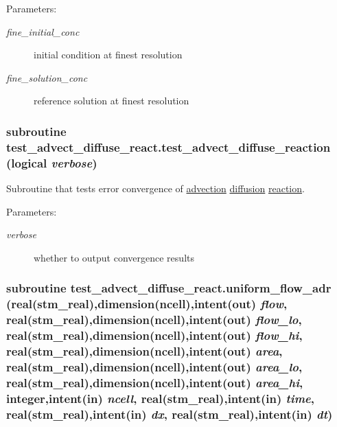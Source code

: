 \begin{Desc}
\item[Parameters:]
\begin{description}
\item[{\em fine\_\-initial\_\-conc}]initial condition at finest resolution\item[{\em fine\_\-solution\_\-conc}]reference solution at finest resolution \end{description}
\end{Desc}
\hypertarget{a00074_934ab4a35a65983c1d52041a6c8c439d}{
\subsubsection[{test\_\-advect\_\-diffuse\_\-reaction}]{\setlength{\rightskip}{0pt plus 5cm}subroutine test\_\-advect\_\-diffuse\_\-react.test\_\-advect\_\-diffuse\_\-reaction (logical {\em verbose})}}
\label{a00074_934ab4a35a65983c1d52041a6c8c439d}


Subroutine that tests error convergence of \hyperlink{a00052}{advection} \hyperlink{a00056}{diffusion} \hyperlink{a00068}{reaction}. 

\begin{Desc}
\item[Parameters:]
\begin{description}
\item[{\em verbose}]whether to output convergence results \end{description}
\end{Desc}
\hypertarget{a00074_80f3a58632d50f76f33e2e90157c7afd}{
\subsubsection[{uniform\_\-flow\_\-adr}]{\setlength{\rightskip}{0pt plus 5cm}subroutine test\_\-advect\_\-diffuse\_\-react.uniform\_\-flow\_\-adr (real(stm\_\-real),dimension(ncell),intent(out) {\em flow}, \/  real(stm\_\-real),dimension(ncell),intent(out) {\em flow\_\-lo}, \/  real(stm\_\-real),dimension(ncell),intent(out) {\em flow\_\-hi}, \/  real(stm\_\-real),dimension(ncell),intent(out) {\em area}, \/  real(stm\_\-real),dimension(ncell),intent(out) {\em area\_\-lo}, \/  real(stm\_\-real),dimension(ncell),intent(out) {\em area\_\-hi}, \/  integer,intent(in) {\em ncell}, \/  real(stm\_\-real),intent(in) {\em time}, \/  real(stm\_\-real),intent(in) {\em dx}, \/  real(stm\_\-real),intent(in) {\em dt})}}
\label{a00074_80f3a58632d50f76f33e2e90157c7afd}


